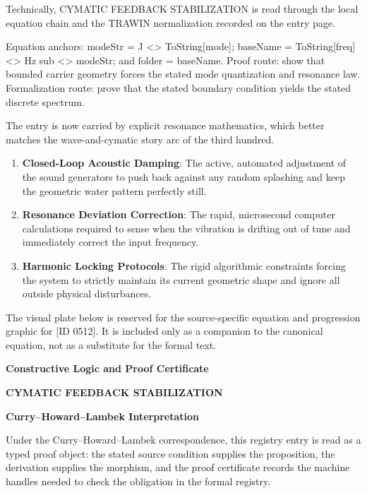 Technically, CYMATIC FEEDBACK STABILIZATION is read through the local equation chain and the TRAWIN normalization recorded on the entry page.

Equation anchors: modeStr = J <> ToString[mode]; baseName = ToString[freq] <> Hz sub <> modeStr; and folder = baseName. Proof route: show that bounded carrier geometry forces the stated mode quantization and resonance law. Formalization route: prove that the stated boundary condition yields the stated discrete spectrum.

The entry is now carried by explicit resonance mathematics, which better matches the wave-and-cymatic story arc of the third hundred.
\endgroup

\begin{enumerate}[leftmargin=1.6em,itemsep=6pt,topsep=4pt]
\item \textbf{Closed-Loop Acoustic Damping}: The active, automated adjustment of the sound generators to push back against any random splashing and keep the geometric water pattern perfectly still.
\item \textbf{Resonance Deviation Correction}: The rapid, microsecond computer calculations required to sense when the vibration is drifting out of tune and immediately correct the input frequency.
\item \textbf{Harmonic Locking Protocols}: The rigid algorithmic constraints forcing the system to strictly maintain its current geometric shape and ignore all outside physical disturbances.
\end{enumerate}

\begingroup\footnotesize\sloppy
The visual plate below is reserved for the source-specific equation and progression graphic for [ID 0512]. It is included only as a companion to the canonical equation, not as a substitute for the formal text.
\par\endgroup
\ifTZPDarkEdition
{}
\fi

\clearpage
\begingroup\tzpsupportsetup
\noindent\textbf{\fontsize{10.8pt}{12.8pt}\selectfont [ID 0512] Constructive Logic and Proof Certificate}\par
\noindent\textbf{\fontsize{10pt}{12pt}\selectfont CYMATIC FEEDBACK STABILIZATION}\par
\vspace{0.45em}
\begingroup
\footnotesize
\setlength{\parskip}{0.22em}
\setlength{\parindent}{0pt}
\noindent\textbf{Curry--Howard--Lambek Interpretation}\par
Under the Curry--Howard--Lambek correspondence, this registry entry is read as a typed proof
object: the stated source condition supplies the proposition, the derivation supplies the
morphism, and the proof certificate records the machine handles needed to check the obligation
in the formal registry.


